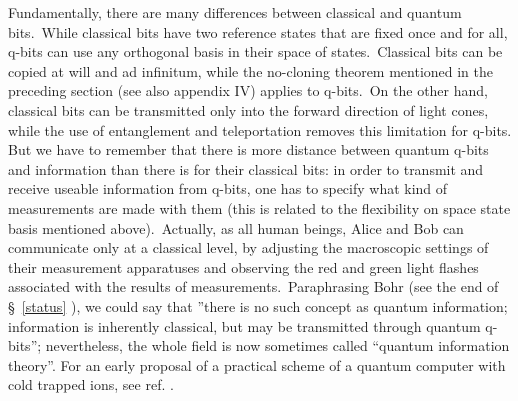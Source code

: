 \documentclass[12pt,onecolumn]{article}%
\begin{document}
Fundamentally, there are many differences between classical and quantum
bits.\ While classical bits have two reference states that are fixed once and
for all, q-bits can use any orthogonal basis in their space of
states.\ Classical bits can be copied at will and ad infinitum, while the
no-cloning theorem mentioned in the preceding section (see also appendix IV)
applies to q-bits.\ On the other hand, classical bits can be transmitted only
into the forward direction of light cones, while the use of entanglement and
teleportation removes this limitation for q-bits. But we have to remember that
there is more distance between quantum q-bits and information than there is
for their classical bits: in order to transmit and receive useable information
from q-bits, one has to specify what kind of measurements are made with them
(this is related to the flexibility on space state basis mentioned
above).\ Actually, as all human beings, Alice and Bob can communicate only at
a classical level, by adjusting the macroscopic settings of their measurement
apparatuses and observing the red and green light flashes associated with the
results of measurements.\ Paraphrasing Bohr (see the end of \S \ \ref{status}%
), we could say that ''there is no such concept as quantum information;
information is inherently classical, but may be transmitted through quantum
q-bits''; nevertheless, the whole field is now sometimes called ``quantum
information theory''. For an early proposal of a practical scheme of a quantum
computer with cold trapped ions, see ref. \cite{Cirac-Zoller}.
\end{document}
